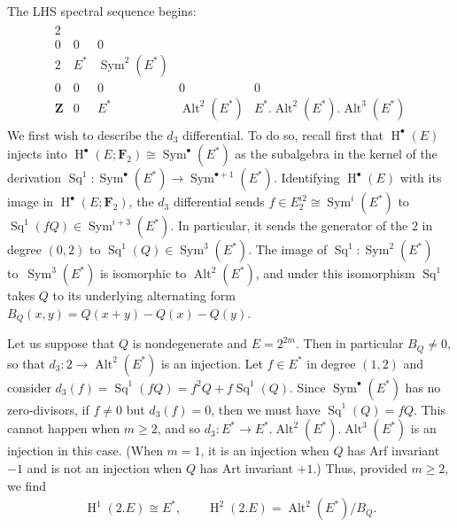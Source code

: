 \documentclass[pdftex]{sigma}
\numberwithin{equation}{section}
\newcommand\bF{\mathbf F}
\newcommand\bZ{\mathbf Z}
\DeclareMathOperator\homology{H}
\renewcommand\H{\homology}
\newcommand\<\langle
\renewcommand\>\rangle
\DeclareMathOperator\Sym{Sym}
\DeclareMathOperator\Alt{Alt}
\DeclareMathOperator\Sq{Sq}
\begin{document}
The LHS spectral sequence begins:
\begin{gather*}
\begin{array}{ccccc}
2 \\
0 & 0 & 0\\
2 & E^* & \Sym^2(E^*) \\
0 & 0 & 0 & 0 & 0 \\
\bZ & 0 & E^* & \Alt^2(E^*) & E^*.\Alt^2(E^*).\Alt^3(E^*)
\end{array}
\end{gather*}
We first wish to describe the $d_3$ differential. To do so, recall first that $\H^\bullet(E)$ injects into $\H^\bullet(E;\bF_2) \cong \Sym^\bullet(E^*)$ as the subalgebra in the kernel of the derivation $\Sq^1\colon \Sym^\bullet(E^*) \to \Sym^{\bullet+1}(E^*)$.
Identifying $\H^\bullet(E)$ with its image in $\H^\bullet(E;\bF_2)$,
 the $d_3$ differential sends $f \in E_2^{i2} \cong \Sym^i(E^*)$ to $\Sq^1(fQ) \in \Sym^{i+3}(E^*)$. In particular, it sends the generator of the $2$ in degree $(0,2)$ to $\Sq^1(Q) \in \Sym^3(E^*)$. The image of $\Sq^1\colon \Sym^2(E^*)$ to~$\Sym^3(E^*)$ is isomorphic to $\Alt^2(E^*)$, and under this isomorphism $\Sq^1$ takes $Q$ to its underlying alternating form $B_Q(x,y) = Q(x+y) - Q(x) - Q(y)$.

Let us suppose that $Q$ is nondegenerate and $E = 2^{2m}$. Then in particular $B_Q \neq 0$, so that $d_3\colon 2 \to \Alt^2(E^*)$ is an injection. Let $f \in E^*$ in degree $(1,2)$ and consider $d_3(f) = \Sq^1(fQ) = f^2Q + f\Sq^1(Q)$. Since $\Sym^\bullet(E^*)$ has no zero-divisors, if $f\neq 0$ but $d_3(f)=0$, then we must have $\Sq^1(Q) = fQ$. This cannot happen when $m\geq 2$, and so $d_3\colon E^* \to E^*.\Alt^2(E^*).\Alt^3(E^*)$ is an injection in this case.
(When $m=1$, it is an injection when $Q$ has Arf invariant $-1$ and is not an injection when $Q$ has Art invariant $+1$.)
Thus, provided $m\geq 2$, we find
\begin{gather*} \H^1(2.E) \cong E^*, \qquad \H^2(2.E) = \Alt^2(E^*)/B_Q. \end{gather*}
\end{document}
